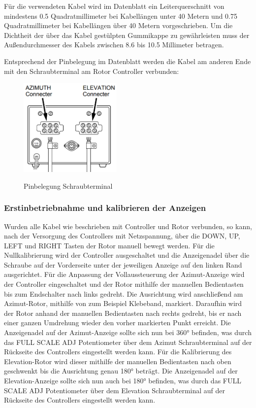 Für die verwendeten Kabel wird im Datenblatt ein Leiterquerschnitt von mindestens 0.5 Quadratmillimeter bei Kabellängen unter 40 Metern und 0.75 Quadratmillimeter bei Kabellängen über 40 Metern vorgeschrieben. Um die Dichtheit der über das Kabel gestülpten Gummikappe zu gewährleisten muss der Außendurchmesser des Kabels zwischen 8.6 bis 10.5 Millimeter betragen.
 
Entsprechend der Pinbelegung im Datenblatt werden die Kabel am anderen Ende mit den Schraubterminal am Rotor Controller verbunden:
\begin{figure}[H]
	\cite{noauthor_yaesu_nodate}
	\centering
	\includegraphics[width=5cm]{../ref/RotorInstallationScrewTerminal.png}
	\label{fig:Rotor_Schraubterminal}
	\caption{Pinbelegung Schraubterminal}
\end{figure}

\subsubsection{Erstinbetriebnahme und kalibrieren der Anzeigen}
Wurden alle Kabel wie beschrieben mit Controller und Rotor verbunden, so kann, nach der Versorgung des Controllers mit Netzspannung, über die DOWN, UP, LEFT und RIGHT Tasten der Rotor manuell bewegt werden. 
\newline
Für die  Nullkalibrierung wird der Controller ausgeschaltet und die Anzeigenadel über die Schraube auf der Vorderseite unter der jeweiligen Anzeige auf den linken Rand ausgerichtet. Für die Anpassung der Vollaussteuerung der Azimut-Anzeige wird der Controller eingeschaltet und der Rotor mithilfe der manuellen Bedientasten bis zum Endschalter nach links gedreht. Die Ausrichtung wird anschließend am Azimut-Rotor, mithilfe von zum Beispiel Klebeband, markiert. Daraufhin wird der Rotor anhand der manuellen Bedientasten nach rechts gedreht, bis er nach einer ganzen Umdrehung wieder den vorher markierten Punkt erreicht. Die Anzeigenadel auf der Azimut-Anzeige sollte sich nun bei 360° befinden, was durch das FULL SCALE ADJ Potentiometer über dem Azimut Schraubterminal auf der Rückseite des Controllers eingestellt werden kann. Für die Kalibrierung des Elevation-Rotor wird dieser mithilfe der manuellen Bedientasten nach oben geschwenkt bis die Ausrichtung genau 180° beträgt. Die Anzeigenadel auf der Elevation-Anzeige sollte sich nun auch bei 180° befinden, was durch das FULL SCALE ADJ Potentiometer über dem Elevation Schraubterminal auf der Rückseite des Controllers eingestellt werden kann.

